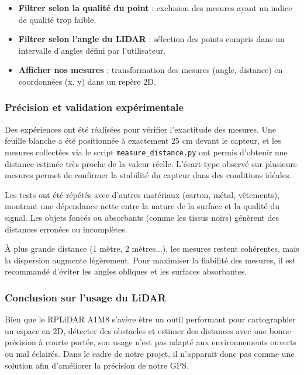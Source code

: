 \begin{itemize}
    \item \textbf{Filtrer selon la qualité du point} : exclusion des mesures ayant un indice de qualité trop faible.
    \item \textbf{Filtrer selon l'angle du LIDAR} : sélection des points compris dans un intervalle d’angles défini par l’utilisateur.
    \item \textbf{Afficher nos mesures} : transformation des mesures (angle, distance) en coordonnées (x, y) dans un repère 2D.
\end{itemize}


\vspace{1em}
\subsubsection*{Précision et validation expérimentale}

Des expériences ont été réalisées pour vérifier l’exactitude des mesures. Une feuille blanche a été positionnée à exactement 25 cm devant le capteur, et les mesures collectées via le script \texttt{measure\_distance.py} ont permis d’obtenir une distance estimée très proche de la valeur réelle. L’écart-type observé sur plusieurs mesures permet de confirmer la stabilité du capteur dans des conditions idéales.

Les tests ont été répétés avec d’autres matériaux (carton, métal, vêtements), montrant une dépendance nette entre la nature de la surface et la qualité du signal. Les objets foncés ou absorbants (comme les tissus noirs) génèrent des distances erronées ou incomplètes.

À plus grande distance (1 mètre, 2 mètres...), les mesures restent cohérentes, mais la dispersion augmente légèrement. Pour maximiser la fiabilité des mesures, il est recommandé d’éviter les angles obliques et les surfaces absorbantes.

\vspace{1em}
\subsubsection*{Conclusion sur l’usage du LiDAR}

Bien que le RPLiDAR A1M8 s’avère être un outil performant pour cartographier un espace en 2D, détecter des obstacles et estimer des distances avec une bonne précision à courte portée, son usage n'est pas adapté aux environnements ouverts ou mal éclairés. Dans le cadre de notre projet, il n'apparait donc pas comme une solution afin d'améliorer la précision de notre GPS.

